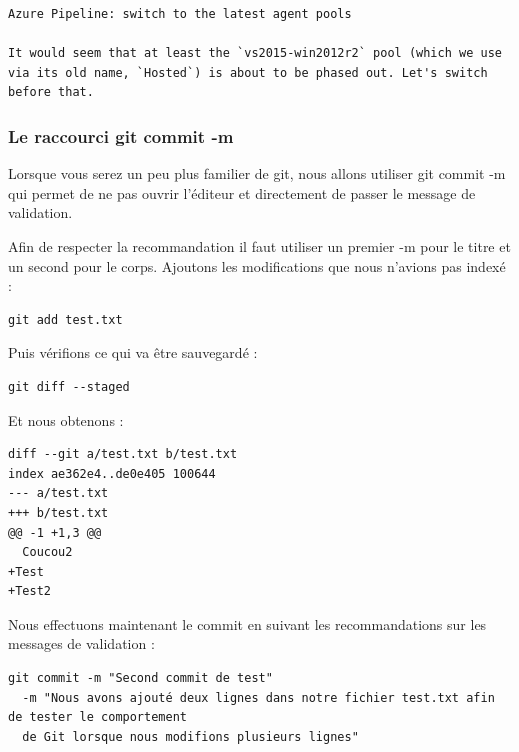 \documentclass{article}
\begin{document}
\begin{verbatim}
Azure Pipeline: switch to the latest agent pools

It would seem that at least the `vs2015-win2012r2` pool (which we use
via its old name, `Hosted`) is about to be phased out. Let's switch
before that.
\end{verbatim}

\subsubsection*{Le raccourci {\color{blue}git commit -m}}
Lorsque vous serez un peu plus familier de {\color{blue}git}, nous allons utiliser {\color{blue}git commit -m} qui permet de ne pas ouvrir l'éditeur et directement de passer le message de validation.

Afin de respecter la recommandation il faut utiliser un premier -m pour le titre et un second pour le corps. Ajoutons les modifications que nous n'avions pas indexé :

\begin{verbatim}
git add test.txt
\end{verbatim}

Puis vérifions ce qui va être sauvegardé :

\begin{verbatim}
git diff --staged
\end{verbatim}

Et nous obtenons :
\begin{verbatim}
diff --git a/test.txt b/test.txt
index ae362e4..de0e405 100644
--- a/test.txt
+++ b/test.txt
@@ -1 +1,3 @@
  Coucou2
+Test
+Test2
\end{verbatim}

Nous effectuons maintenant le {\color{blue}commit} en suivant les recommandations sur les messages de validation :


\begin{verbatim}
git commit -m "Second commit de test" 
  -m "Nous avons ajouté deux lignes dans notre fichier test.txt afin de tester le comportement 
  de Git lorsque nous modifions plusieurs lignes"
\end{verbatim}
\end{document}
